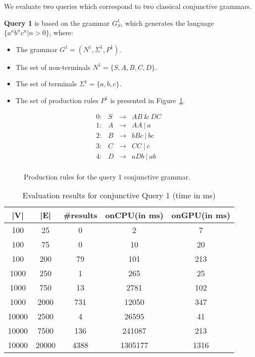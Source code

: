 We evaluate two queries which correspond to two classical conjunctive grammars.

\textbf{Query 1} is based on the grammar $G^1_S$, which generates the language $\{a^n b^n c^n | n > 0\}$, where:
\begin{itemize}
	\item The grammar $G^1 = (N^1, \Sigma^1, P^1)$.
	\item The set of non-terminals $N^1 = \{S, A, B, C, D\}$.
	\item The set of terminals $\Sigma^1 = \{a, b, c\}.$
	\item The set of production rules $P^1$ is presented in Figure~\ref{ProductionRulesQuery1}.
\end{itemize}

\begin{figure}[h]
	\[
	\begin{array}{rccl}
	0: & S & \rightarrow & AB ~\& ~DC \\ 
	1: & A & \rightarrow & AA ~|~ a \\ 
	2: & B & \rightarrow & bBc ~|~ bc \\ 
	3: & C & \rightarrow & CC ~|~ c \\ 
	4: & D & \rightarrow & aDb ~|~ ab \\ 
	\end{array}
	\]
	\caption{Production rules for the query 1 conjunctive grammar.}
	\label{ProductionRulesQuery1}
\end{figure}

\begin{table*}[ht]
	\centering
	\caption{Evaluation results for conjunctive Query 1 (time in ms)}
	\label{tbl1}
	
	\begin{tabular}{ | c | c | c | c | c |}
		\hline
		|V| & |E| & \#results & onCPU(in ms) & onGPU(in ms) \\
		\hline 
		\hline
		100 & 25 & 0 & 2 & 7\\
		100 & 75 & 0 & 10 & 20\\
		100 & 200 & 79 & 101 & 213\\
		1000  & 250 & 1 & 265 & 25\\
		1000 & 750 & 13 & 2781 & 102\\
		1000 & 2000 & 731 & 12050 & 347\\
		10000 & 2500 & 4 & 26595 & 41\\
		10000 & 7500 & 136 & 241087 & 213\\
		10000 & 20000 & 4388 & 1305177 & 1316\\
		\hline
	\end{tabular}
	
\end{table*}

